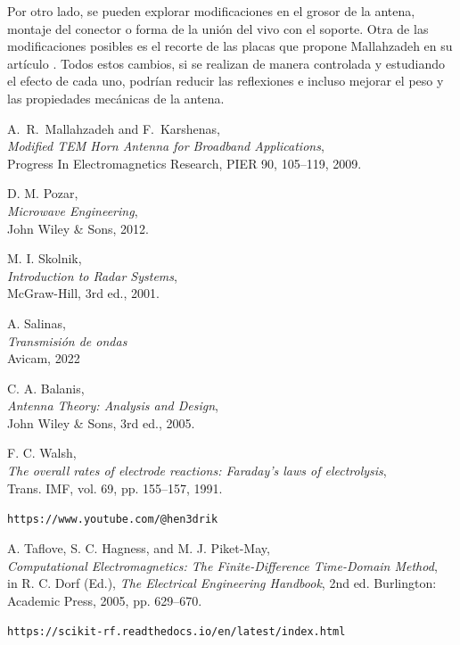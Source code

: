 \documentclass[11pt,a4paper,twoside,pdf]{article}
\numberwithin{equation}{section}
\begin{document}
Por otro lado, se pueden explorar modificaciones en el grosor de la antena, montaje del conector o forma de la unión del vivo con el soporte. Otra de las modificaciones posibles es el recorte de las placas que propone Mallahzadeh en su artículo \cite{tem_horn}. Todos estos cambios, si se realizan de manera controlada y estudiando el efecto de cada uno, podrían reducir las reflexiones e incluso mejorar el peso y las propiedades mecánicas de la antena.




\begin{thebibliography}{100}

A.~R.~Mallahzadeh and F.~Karshenas, \\
{\em Modified TEM Horn Antenna for Broadband Applications}, \\
Progress In Electromagnetics Research, PIER 90, 105--119, 2009.

D. M. Pozar, \\
\textit{Microwave Engineering},\\
John Wiley \& Sons, 2012.

M. I. Skolnik, \\
\textit{Introduction to Radar Systems},\\
McGraw-Hill, 3rd ed., 2001.

A. Salinas,\\
\textit{Transmisión de ondas}\\
Avicam, 2022

C. A. Balanis, \\
\textit{Antenna Theory: Analysis and Design},\\
John Wiley \& Sons, 3rd ed., 2005.

F. C. Walsh, \\
\textit{The overall rates of electrode reactions: Faraday's laws of electrolysis},\\
Trans. IMF, vol. 69, pp. 155--157, 1991.

\texttt{https://www.youtube.com/@hen3drik}

A. Taflove, S. C. Hagness, and M. J. Piket-May, \\
\textit{Computational Electromagnetics: The Finite-Difference Time-Domain Method},\\
in R. C. Dorf (Ed.), \textit{The Electrical Engineering Handbook}, 2nd ed. Burlington: Academic Press, 2005, pp. 629--670.

\texttt{https://scikit-rf.readthedocs.io/en/latest/index.html}


\end{thebibliography}
\end{document}
